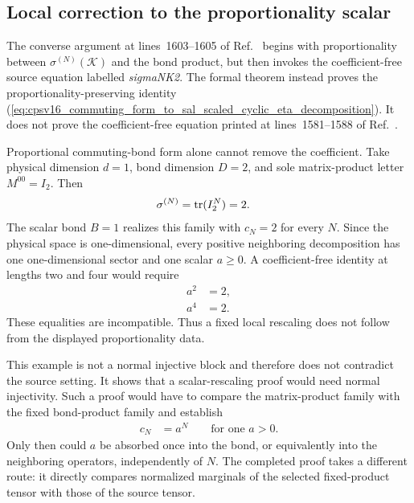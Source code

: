 \documentclass{article}
\begin{document}
\subsection{Local correction to the proportionality scalar}

The converse argument at lines~1603--1605 of
Ref.~\cite{Cirac2016MPDO_arXiv} begins with proportionality between
$\sigma^{(N)}(\mathcal K)$ and the bond product, but then invokes the
coefficient-free source equation labelled \emph{sigmaNK2}. The formal theorem
instead proves the proportionality-preserving identity
(\ref{eq:cpsv16_commuting_form_to_sal_scaled_cyclic_eta_decomposition}). It
does not prove the coefficient-free equation printed at lines~1581--1588 of
Ref.~\cite{Cirac2016MPDO_arXiv}.

Proportional commuting-bond form alone cannot remove the coefficient. Take
physical dimension $d=1$, bond dimension $D=2$, and sole matrix-product letter
$M^{00}=I_2$. Then
\begin{align}
    \sigma^{(N)}
        &=\operatorname{tr}(I_2^N)
         =2.
    \label{eq:cpsv16_commuting_form_to_sal_scalar_counterexample_mpo}
\end{align}
The scalar bond $B=1$ realizes this family with $c_N=2$ for every $N$. Since
the physical space is one-dimensional, every positive neighboring
decomposition has one one-dimensional sector and one scalar $a\geq0$. A
coefficient-free identity at lengths two and four would require
\begin{align}
    a^2
        &=2,
    \label{eq:cpsv16_commuting_form_to_sal_scalar_counterexample_length_two}\\
    a^4
        &=2.
    \label{eq:cpsv16_commuting_form_to_sal_scalar_counterexample_length_four}
\end{align}
These equalities are incompatible. Thus a fixed local rescaling does not
follow from the displayed proportionality data.

This example is not a normal injective block and therefore does not contradict
the source setting. It shows that a scalar-rescaling proof would need normal
injectivity. Such a proof would have to compare the matrix-product family with
the fixed bond-product family and establish
\begin{align}
    c_N
        &=a^N
        \qquad\text{for one }a>0.
    \label{eq:cpsv16_commuting_form_to_sal_exponential_realization_scalar}
\end{align}
Only then could $a$ be absorbed once into the bond, or equivalently into the
neighboring operators, independently of $N$. The completed proof takes a
different route: it directly compares normalized marginals of the selected
fixed-product tensor with those of the source tensor.
\end{document}
